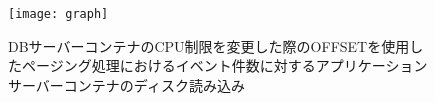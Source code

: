 \documentclass[../../../../../main]{subfiles}
\begin{document}
    \begin{figure}[H]
        \centering
        \texttt{[image: graph]}
        \caption{DBサーバーコンテナのCPU制限を変更した際のOFFSETを使用したページング処理におけるイベント件数に対するアプリケーションサーバーコンテナのディスク読み込み}
        \label{fig:paging-offset-change-db-cpu-limit-app-disk-out-app_4_8192-db_1024}
    \end{figure}
\end{document}
